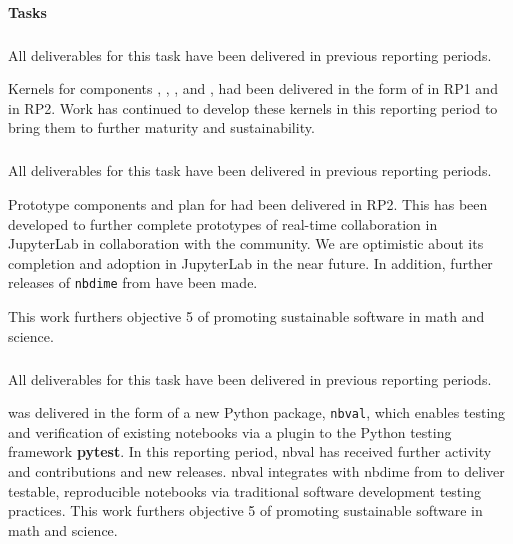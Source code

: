 \paragraph{Tasks}

\subparagraph{}
\label{UI@ipython-kernels}

All deliverables for this task have been delivered in previous reporting periods.

Kernels for \ODK components \GAP, \Pari, \Sage, and \Singular,
had been delivered in the form of 
in RP1 and  in RP2.
Work has continued to develop these kernels in this reporting period
to bring them to further maturity and sustainability.

\subparagraph{}
\label{UI@notebook-collab}

All deliverables for this task have been delivered in previous reporting periods.


Prototype components and plan for  had been delivered in RP2.
This has been developed to further complete prototypes of real-time collaboration in JupyterLab in collaboration with the \Jupyter community.
We are optimistic about its completion and adoption in JupyterLab in the near future.
In addition, further releases of \texttt{nbdime} from  have been made.

This work furthers \ODK objective 5 of promoting sustainable software in math and science.


\subparagraph{}
\label{UI@notebook-verification}

All deliverables for this task have been delivered in previous reporting periods.

 was delivered in the form of a new Python package, \texttt{nbval},
which enables testing and verification of existing notebooks via a plugin to the Python testing
framework \textbf{pytest}.
In this reporting period, nbval has received further activity and contributions and new releases.
nbval integrates with nbdime from  to deliver
testable, reproducible notebooks via traditional software development testing practices.
This work furthers \ODK objective 5 of promoting sustainable software in math and science.

